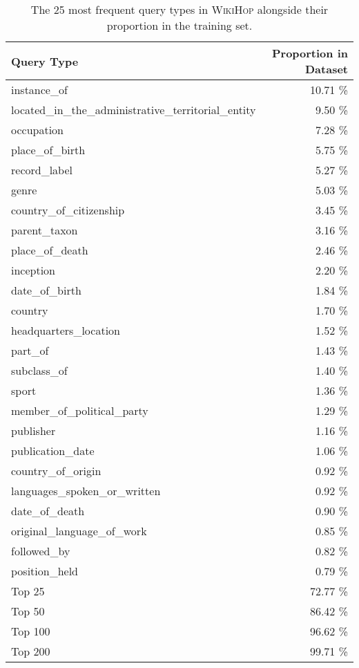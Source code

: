 \documentclass[11pt,letterpaper]{article}
\newcommand{\WikiHop}{\textsc{WikiHop}\xspace}
\begin{document}
\begin{table*}\label{tab:query_types}
    \centering
    \begin{tabular}{l r}
        Query Type  & Proportion in Dataset\\
        \toprule
        instance\_of & 10.71 \% \\
        located\_in\_the\_administrative\_territorial\_entity & 9.50 \% \\
        occupation & 7.28 \% \\
        place\_of\_birth & 5.75 \% \\
        record\_label & 5.27 \% \\
        genre & 5.03 \% \\
        country\_of\_citizenship & 3.45 \% \\
        parent\_taxon & 3.16 \% \\
        place\_of\_death & 2.46 \% \\
        inception & 2.20 \% \\
        date\_of\_birth & 1.84 \% \\
        country & 1.70 \% \\
        headquarters\_location & 1.52 \% \\
        part\_of & 1.43 \% \\
        subclass\_of & 1.40 \% \\
        sport & 1.36 \% \\
        member\_of\_political\_party & 1.29 \% \\
        publisher & 1.16 \% \\
        publication\_date & 1.06 \% \\
        country\_of\_origin & 0.92 \% \\
        languages\_spoken\_or\_written & 0.92 \% \\
        date\_of\_death & 0.90 \% \\
        original\_language\_of\_work & 0.85 \% \\
        followed\_by & 0.82 \% \\
        position\_held & 0.79 \% \\
        \midrule
        Top 25 & 72.77 \% \\
        Top 50 & 86.42 \% \\
        Top 100 & 96.62 \% \\
        Top 200 & 99.71 \% \\
        \bottomrule
    \end{tabular}
    \caption{The 25 most frequent query types in \WikiHop alongside their proportion in the training set.
    }
    \label{tbl:query-types}
\end{table*}
\end{document}
